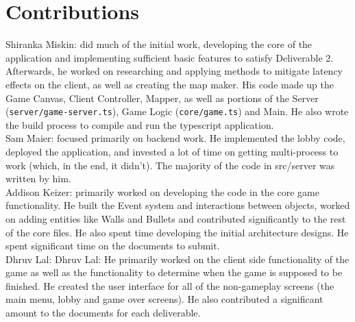 \documentclass[12pt]{report}
\begin{document}
\chapter{Contributions}

Shiranka Miskin:  did much of the initial work, developing the core of the application and implementing sufficient basic features to satisfy Deliverable 2.  Afterwards, he worked on researching and applying methods to mitigate latency effects on the client, as well as creating the map maker.  His code made up the Game Canvas, Client Controller, Mapper, as well as portions of the Server (\texttt{server/game-server.ts}), Game Logic (\texttt{core/game.ts}) and Main.  He also wrote the build process to compile and run the typescript application.\\

Sam Maier: focused primarily on backend work. He implemented the lobby code, deployed the application, and invested a lot of time on getting multi-process to work (which, in the end, it didn't). The majority of the code in src/server was written by him. \\

Addison Keizer: primarily worked on developing the code in the core game functionality. He built the Event system and interactions between objects, worked on adding entities like Walls and Bullets and contributed significantly to the rest of the core files. He also spent time developing the initial architecture designs. He spent significant time on the documents to submit. \\

Dhruv Lal: Dhruv Lal: He primarily worked on the client side functionality of the game as well as the functionality to determine when the game is supposed to be finished. He created the user interface for all of the non-gameplay screens (the main menu, lobby and game over screens). He also contributed a significant amount to the documents for each deliverable. \\
\end{document}
